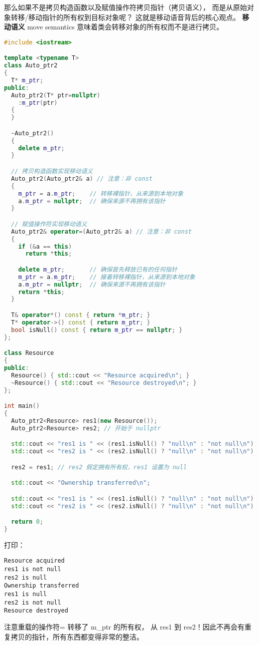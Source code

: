 \documentclass[../../LearnCpp.tex]{subfiles}
\begin{document}
那么如果不是拷贝构造函数以及赋值操作符拷贝指针（拷贝语义），
而是从原始对象转移/移动指针的所有权到目标对象呢？
这就是移动语音背后的核心观点。
\textbf{移动语义} move semantics 意味着类会转移对象的所有权而不是进行拷贝。

\begin{lstlisting}[language=C++]
#include <iostream>

template <typename T>
class Auto_ptr2
{
  T* m_ptr;
public:
  Auto_ptr2(T* ptr=nullptr)
    :m_ptr(ptr)
  {
  }

  ~Auto_ptr2()
  {
    delete m_ptr;
  }

  // 拷贝构造函数实现移动语义
  Auto_ptr2(Auto_ptr2& a) // 注意：非 const
  {
    m_ptr = a.m_ptr;    // 转移裸指针，从来源到本地对象
    a.m_ptr = nullptr;  // 确保来源不再拥有该指针
  }

  // 赋值操作符实现移动语义
  Auto_ptr2& operator=(Auto_ptr2& a) // 注意：非 const
  {
    if (&a == this)
      return *this;

    delete m_ptr;       // 确保首先释放已有的任何指针
    m_ptr = a.m_ptr;    // 接着转移裸指针，从来源到本地对象
    a.m_ptr = nullptr;  // 确保来源不再拥有该指针
    return *this;
  }

  T& operator*() const { return *m_ptr; }
  T* operator->() const { return m_ptr; }
  bool isNull() const { return m_ptr == nullptr; }
};

class Resource
{
public:
  Resource() { std::cout << "Resource acquired\n"; }
  ~Resource() { std::cout << "Resource destroyed\n"; }
};

int main()
{
  Auto_ptr2<Resource> res1(new Resource());
  Auto_ptr2<Resource> res2; // 开始于 nullptr

  std::cout << "res1 is " << (res1.isNull() ? "null\n" : "not null\n");
  std::cout << "res2 is " << (res2.isNull() ? "null\n" : "not null\n");

  res2 = res1; // res2 假定拥有所有权，res1 设置为 null

  std::cout << "Ownership transferred\n";

  std::cout << "res1 is " << (res1.isNull() ? "null\n" : "not null\n");
  std::cout << "res2 is " << (res2.isNull() ? "null\n" : "not null\n");

  return 0;
}
\end{lstlisting}

打印：

\begin{lstlisting}
Resource acquired
res1 is not null
res2 is null
Ownership transferred
res1 is null
res2 is not null
Resource destroyed
\end{lstlisting}

注意重载的操作符= 转移了 m\_ptr 的所有权，
从 res1 到 res2！因此不再会有重复拷贝的指针，所有东西都变得非常的整洁。
\end{document}
